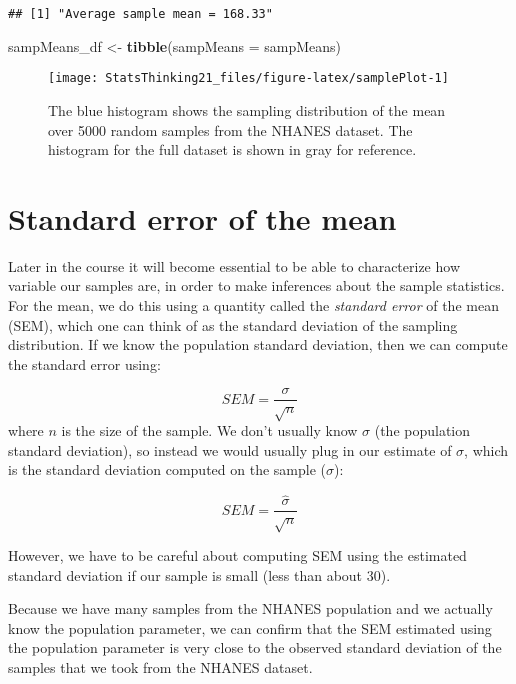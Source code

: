 \documentclass[]{book}
\newenvironment{Shaded}{\begin{snugshade}}{\end{snugshade}}
\newcommand{\KeywordTok}[1]{\textcolor[rgb]{0.13,0.29,0.53}{\textbf{#1}}}
\newcommand{\DataTypeTok}[1]{\textcolor[rgb]{0.13,0.29,0.53}{#1}}
\newcommand{\StringTok}[1]{\textcolor[rgb]{0.31,0.60,0.02}{#1}}
\newcommand{\NormalTok}[1]{#1}
\theoremstyle{definition}
\theoremstyle{definition}
\theoremstyle{definition}
\theoremstyle{remark}
\begin{document}
\begin{verbatim}
## [1] "Average sample mean = 168.33"
\end{verbatim}

\begin{Shaded}
\begin{Highlighting}[]
\NormalTok{sampMeans_df <-}\StringTok{ }\KeywordTok{tibble}\NormalTok{(}\DataTypeTok{sampMeans =}\NormalTok{ sampMeans)}
\end{Highlighting}
\end{Shaded}

\begin{figure}
\texttt{[image: StatsThinking21\_files/figure-latex/samplePlot-1]} \caption{The blue histogram shows the sampling distribution of the mean over 5000 random samples from the NHANES dataset.  The histogram for the full dataset is shown in gray for reference.}\label{fig:samplePlot}
\end{figure}

\section{Standard error of the mean}\label{standard-error-of-the-mean}

Later in the course it will become essential to be able to characterize
how variable our samples are, in order to make inferences about the
sample statistics. For the mean, we do this using a quantity called the
\emph{standard error} of the mean (SEM), which one can think of as the
standard deviation of the sampling distribution. If we know the
population standard deviation, then we can compute the standard error
using:

\[
SEM = \frac{\sigma}{\sqrt{n}}
\] where \(n\) is the size of the sample. We don't usually know
\(\sigma\) (the population standard deviation), so instead we would
usually plug in our estimate of \(\sigma\), which is the standard
deviation computed on the sample (\(\hat{\sigma}\)):

\[
SEM = \frac{\hat{\sigma}}{\sqrt{n}}
\]

However, we have to be careful about computing SEM using the estimated
standard deviation if our sample is small (less than about 30).

Because we have many samples from the NHANES population and we actually
know the population parameter, we can confirm that the SEM estimated
using the population parameter is very close to the observed standard
deviation of the samples that we took from the NHANES dataset.
\end{document}

